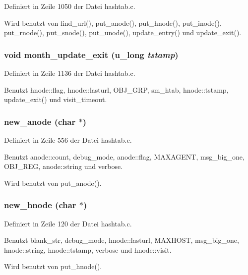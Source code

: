 Definiert in Zeile 1050 der Datei hashtab.c.

Wird benutzt von find\_\-url(), put\_\-anode(), put\_\-hnode(), put\_\-inode(), put\_\-rnode(), put\_\-snode(), put\_\-unode(), update\_\-entry() und update\_\-exit().
\subsubsection{\setlength{\rightskip}{0pt plus 5cm}void month\_\-update\_\-exit (u\_\-long {\em tstamp})}\label{hashtab_8c_8bd37405a172f7642453f9a1fae7438f}




Definiert in Zeile 1136 der Datei hashtab.c.

Benutzt hnode::flag, hnode::lasturl, OBJ\_\-GRP, sm\_\-htab, hnode::tstamp, update\_\-exit() und visit\_\-timeout.
\subsubsection{ new\_\-anode (char $\ast$)}\label{hashtab_8c_77e03d0d91a9f6365711aed781c218f2}




Definiert in Zeile 556 der Datei hashtab.c.

Benutzt anode::count, debug\_\-mode, anode::flag, MAXAGENT, msg\_\-big\_\-one, OBJ\_\-REG, anode::string und verbose.

Wird benutzt von put\_\-anode().
\subsubsection{ new\_\-hnode (char $\ast$)}\label{hashtab_8c_ca7c730d21349d04dcff3556d0a89fec}




Definiert in Zeile 120 der Datei hashtab.c.

Benutzt blank\_\-str, debug\_\-mode, hnode::lasturl, MAXHOST, msg\_\-big\_\-one, hnode::string, hnode::tstamp, verbose und hnode::visit.

Wird benutzt von put\_\-hnode().
